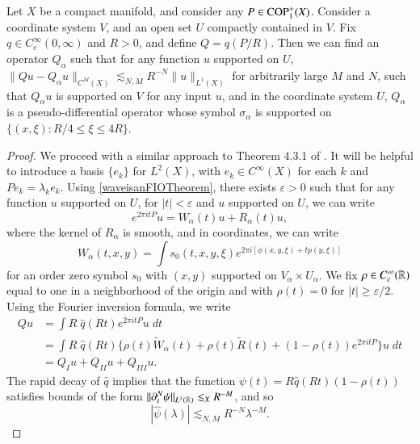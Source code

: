 \begin{theorem} \label{PseudoOsicllatoryLemma}
  Let $X$ be a compact manifold, and consider any $P \in {\text{COP}^{+}_{{1}}}(X)$. Consider a coordinate system $V$, and an open set $U$ compactly contained in $V$. Fix $q \in C_c^\infty(0,\infty)$ and $R > 0$, and define $Q = q(P/R)$. Then we can find an operator $Q_\alpha$ such that for any function $u$ supported on $U$, $\| Qu - Q_\alpha u \|_{C^M(X)} \lesssim_{N,M} R^{-N} \| u \|_{L^1(X)}$ for arbitrarily large $M$ and $N$, such that $Q_\alpha u$ is supported on $V$ for any input $u$, and in the coordinate system $U$, $Q_\alpha$ is a pseudo-differential operator whose symbol $\sigma_\alpha$ is supported on $\{ (x,\xi): R/4 \leq \xi \leq 4R \}$.
\end{theorem}
\begin{proof}
  We proceed with a similar approach to Theorem 4.3.1 of \cite{Sogge}. It will be helpful to introduce a basis $\{ e_k \}$ for $L^2(X)$, with $e_k \in C^\infty(X)$ for each $k$ and $Pe_k = \lambda_k e_k$. Using \ref{waveisanFIOTheorem}, there exists $\varepsilon > 0$ such that for any function $u$ supported on $U$, for $|t| < \varepsilon$ and $u$ supported on $U$, we can write
  \[ e^{2 \pi i t P} u = W_\alpha(t) u + R_\alpha(t) u, \]
  where the kernel of $R_\alpha$ is smooth, and in coordinates, we can write
  \[ W_\alpha(t,x,y) = \int s_0(t,x,y,\xi) e^{2 \pi i [ \phi(x,y,\xi) + t p(y,\xi) ]} \]
  for an order zero symbol $s_0$ with $(x,y)$ supported on $V_\alpha \times U_\alpha$. We fix $\rho \in C_c^\infty(\operatorname{\mathbb{R}})$ equal to one in a neighborhood of the origin and with $\rho(t) = 0$ for $|t| \geq \varepsilon / 2$. Using the Fourier inversion formula, we write
    \begin{equation}
    \begin{split}
        Qu &= \int R\;\! \widehat{q}(R t) e^{2 \pi i t P}u\; dt\\
        &= \int R\;\! \widehat{q}(Rt) \Big\{ \rho(t) \tilde{W}_\alpha(t) + \rho(t) \tilde{R}(t) + (1 - \rho(t)) e^{2 \pi i t P} \Big\} u\; dt\\
        &= Q_I u + Q_{II} u + Q_{III} u.
    \end{split}
    \end{equation}
    The rapid decay of $\widehat{q}$ implies that the function $\psi(t) = R \widehat{q}(Rt) (1 - \rho(t))$ satisfies bounds of the form $\| \partial_t^N \psi \|_{L^1(\operatorname{\mathbb{R}})} \lesssim_X R^{-M}$, and so
    \begin{equation} \label{psidecaybound}
        |\widehat{\psi}(\lambda)| \lesssim_{N,M} R^{-N} \lambda^{-M}.

\end{equation}
\end{proof}
